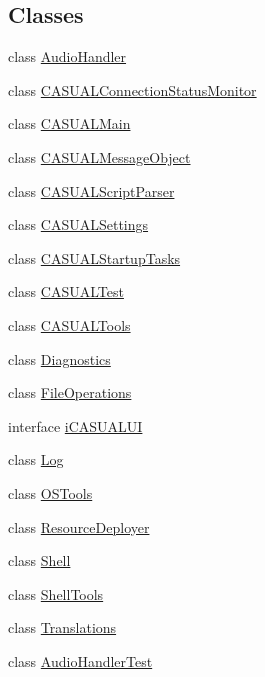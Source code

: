 \subsection*{Classes}
\begin{DoxyCompactItemize}
\item 
class \hyperlink{class_c_a_s_u_a_l_1_1_audio_handler}{Audio\-Handler}
\item 
class \hyperlink{class_c_a_s_u_a_l_1_1_c_a_s_u_a_l_connection_status_monitor}{C\-A\-S\-U\-A\-L\-Connection\-Status\-Monitor}
\item 
class \hyperlink{class_c_a_s_u_a_l_1_1_c_a_s_u_a_l_main}{C\-A\-S\-U\-A\-L\-Main}
\item 
class \hyperlink{class_c_a_s_u_a_l_1_1_c_a_s_u_a_l_message_object}{C\-A\-S\-U\-A\-L\-Message\-Object}
\item 
class \hyperlink{class_c_a_s_u_a_l_1_1_c_a_s_u_a_l_script_parser}{C\-A\-S\-U\-A\-L\-Script\-Parser}
\item 
class \hyperlink{class_c_a_s_u_a_l_1_1_c_a_s_u_a_l_settings}{C\-A\-S\-U\-A\-L\-Settings}
\item 
class \hyperlink{class_c_a_s_u_a_l_1_1_c_a_s_u_a_l_startup_tasks}{C\-A\-S\-U\-A\-L\-Startup\-Tasks}
\item 
class \hyperlink{class_c_a_s_u_a_l_1_1_c_a_s_u_a_l_test}{C\-A\-S\-U\-A\-L\-Test}
\item 
class \hyperlink{class_c_a_s_u_a_l_1_1_c_a_s_u_a_l_tools}{C\-A\-S\-U\-A\-L\-Tools}
\item 
class \hyperlink{class_c_a_s_u_a_l_1_1_diagnostics}{Diagnostics}
\item 
class \hyperlink{class_c_a_s_u_a_l_1_1_file_operations}{File\-Operations}
\item 
interface \hyperlink{interface_c_a_s_u_a_l_1_1i_c_a_s_u_a_l_u_i}{i\-C\-A\-S\-U\-A\-L\-U\-I}
\item 
class \hyperlink{class_c_a_s_u_a_l_1_1_log}{Log}
\item 
class \hyperlink{class_c_a_s_u_a_l_1_1_o_s_tools}{O\-S\-Tools}
\item 
class \hyperlink{class_c_a_s_u_a_l_1_1_resource_deployer}{Resource\-Deployer}
\item 
class \hyperlink{class_c_a_s_u_a_l_1_1_shell}{Shell}
\item 
class \hyperlink{class_c_a_s_u_a_l_1_1_shell_tools}{Shell\-Tools}
\item 
class \hyperlink{class_c_a_s_u_a_l_1_1_translations}{Translations}
\item 
class \hyperlink{class_c_a_s_u_a_l_1_1_audio_handler_test}{Audio\-Handler\-Test}

\end{DoxyCompactItemize}
